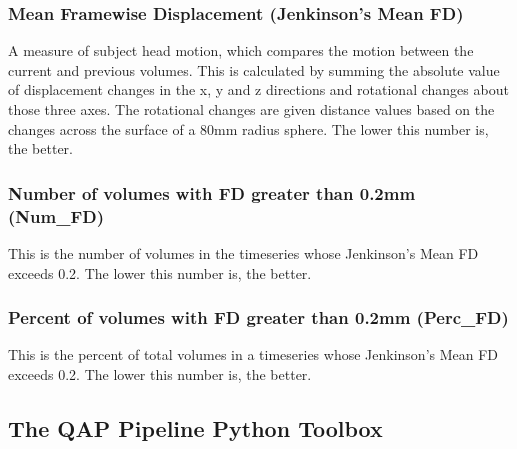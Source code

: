 \documentclass{frontiersSCNS} %
\begin{document}
\subsubsection{Mean Framewise Displacement (Jenkinson’s Mean FD)}
\label{sec:16}
A measure of subject head motion, which compares the motion between the current and previous volumes. This is calculated by summing the absolute value of displacement changes in the x, y and z directions and rotational changes about those three axes. The rotational changes are given distance values based on the changes across the surface of a 80mm radius sphere. The lower this number is, the better.
\subsubsection{Number of volumes with FD greater than 0.2mm (Num\_FD)}
\label{sec:17}
This is the number of volumes in the timeseries whose Jenkinson’s Mean FD exceeds 0.2. The lower this number is, the better.
\subsubsection{Percent of volumes with FD greater than 0.2mm (Perc\_FD)}
\label{sec:18}
This is the percent of total volumes in a timeseries whose Jenkinson’s Mean FD exceeds 0.2. The lower this number is, the better.
\subsection{The QAP Pipeline Python Toolbox}
\label{sec:19}
\end{document}

